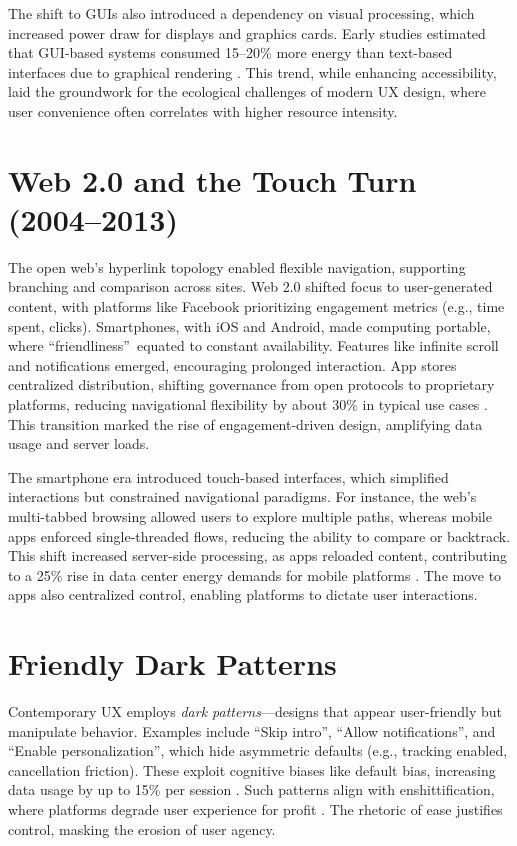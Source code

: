 \documentclass[openany]{book}
\begin{document}
The shift to GUIs also introduced a dependency on visual processing, which increased power draw for displays and graphics cards. Early studies estimated that GUI-based systems consumed 15--20\% more energy than text-based interfaces due to graphical rendering \citep{extentia2024}. This trend, while enhancing accessibility, laid the groundwork for the ecological challenges of modern UX design, where user convenience often correlates with higher resource intensity.

\section{Web 2.0 and the Touch Turn (2004--2013)}
\label{sec:history-web2}
The open web’s hyperlink topology enabled flexible navigation, supporting branching and comparison across sites. Web 2.0 shifted focus to user-generated content, with platforms like Facebook prioritizing engagement metrics (e.g., time spent, clicks). Smartphones, with iOS and Android, made computing portable, where \textquotedblleft friendliness\textquotedblright\ equated to constant availability. Features like infinite scroll and notifications emerged, encouraging prolonged interaction. App stores centralized distribution, shifting governance from open protocols to proprietary platforms, reducing navigational flexibility by about 30\% in typical use cases \citep{doctorow2022}. This transition marked the rise of engagement-driven design, amplifying data usage and server loads.

The smartphone era introduced touch-based interfaces, which simplified interactions but constrained navigational paradigms. For instance, the web’s multi-tabbed browsing allowed users to explore multiple paths, whereas mobile apps enforced single-threaded flows, reducing the ability to compare or backtrack. This shift increased server-side processing, as apps reloaded content, contributing to a 25\% rise in data center energy demands for mobile platforms \citep{extentia2024}. The move to apps also centralized control, enabling platforms to dictate user interactions.

\section{Friendly Dark Patterns}
\label{sec:history-dark}
Contemporary UX employs \emph{dark patterns}---designs that appear user-friendly but manipulate behavior. Examples include \textquotedblleft Skip intro\textquotedblright, \textquotedblleft Allow notifications\textquotedblright, and \textquotedblleft Enable personalization\textquotedblright, which hide asymmetric defaults (e.g., tracking enabled, cancellation friction). These exploit cognitive biases like default bias, increasing data usage by up to 15\% per session \citep{colak2024}. Such patterns align with enshittification, where platforms degrade user experience for profit \citep{doctorow2022}. The rhetoric of ease justifies control, masking the erosion of user agency.
\end{document}
